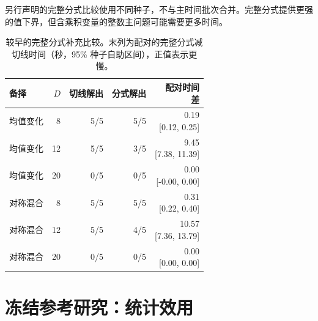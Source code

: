 \documentclass[11pt,a4paper]{article}
\begin{document}
另行声明的完整分式比较使用不同种子，不与主时间批次合并。完整分式提供更强的值下界，但含乘积变量的整数主问题可能需要更多时间。
\begin{table}[htbp]\centering\small\setlength{\tabcolsep}{3.5pt}
\caption{较早的完整分式补充比较。末列为配对的完整分式减切线时间（秒，95\% 种子自助区间），正值表示更慢。}\label{tab:reference-ratio}
\begin{tabularx}{\linewidth}{@{}p{24mm}rrrr@{}}
\toprule 备择 & $D$ & 切线解出 & 分式解出 & \shortstack{配对时间\\差} \\
\midrule
均值变化 & 8 & 5/5 & 5/5 & \shortstack{0.19\\{[0.12, 0.25]}} \\
均值变化 & 12 & 5/5 & 3/5 & \shortstack{9.45\\{[7.38, 11.39]}} \\
均值变化 & 20 & 0/5 & 0/5 & \shortstack{0.00\\{[-0.00, 0.00]}} \\
对称混合 & 8 & 5/5 & 5/5 & \shortstack{0.31\\{[0.22, 0.40]}} \\
对称混合 & 12 & 5/5 & 4/5 & \shortstack{10.57\\{[7.36, 13.79]}} \\
对称混合 & 20 & 0/5 & 0/5 & \shortstack{0.00\\{[0.00, 0.00]}} \\
\bottomrule\end{tabularx}\end{table}


\FloatBarrier
\section{冻结参考研究：统计效用}\label{sec:statistics}
\end{document}
